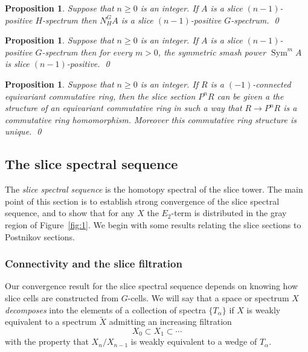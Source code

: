 \documentclass{amsart}
\newtheorem{prop}[equation]{Proposition}
\theoremstyle{definition}
\theoremstyle{remark}
\DeclareMathOperator{\sym}{Sym}
\newcommand{\norm}{N}
\begin{document}
\begin{prop}
\label{thm:100}
Suppose that $n\ge 0$ is an integer.  If $A$ is a slice
$(n-1)$-positive $H$-spectrum then $\norm_{H}^{G}A$ is a slice
$(n-1)$-positive $G$-spectrum.  \qed
\end{prop}

\begin{prop}
\label{thm:24}
Suppose that $n\ge 0$ is an integer.  If $A$ is a slice
$(n-1)$-positive $G$-spectrum then for every $m>0$, the symmetric
smash power $\sym^{m}A$ is slice $(n-1)$-positive. \qed
\end{prop}

\begin{prop}
\label{thm:49}
Suppose that $n\ge 0$ is an integer.  If $R$ is a
$(-1)$-connected equivariant commutative ring, then the slice section
$P^{n}R$ can be given a the structure of an equivariant commutative
ring in such a way that $R\to P^{n}R$ is a commutative ring
homomorphism.  Moreover this commutative ring structure is unique.
\qed
\end{prop}



\subsection{The slice spectral sequence}
\label{sec:conv-slice-tower}

The {\em slice spectral sequence} is the homotopy spectral of the
slice tower.  The main point of this section is to establish strong
convergence of the slice spectral sequence, and to show that for any
$X$ the $E_{2}$-term is distributed in the gray region of
Figure~\ref{fig:1}.   We begin with some results relating the slice
sections to Postnikov sections.

\subsubsection{Connectivity and the slice filtration}
\label{sec:constr-slice-cells}

Our convergence result for the slice spectral sequence depends on
knowing how slice cells are constructed from $G$-cells.  We will say
that a space or spectrum $X$ {\em decomposes} into the elements of a
collection of spectra $\{T_{\alpha} \}$ if $X$ is weakly equivalent to
a spectrum $\tilde X$ admitting an increasing filtration
\[
X_{0}\subset X_{1}\subset \cdots
\]
with the property that $X_{n}/X_{n-1}$ is weakly equivalent to a wedge
of $T_{\alpha}$.  
\end{document}
